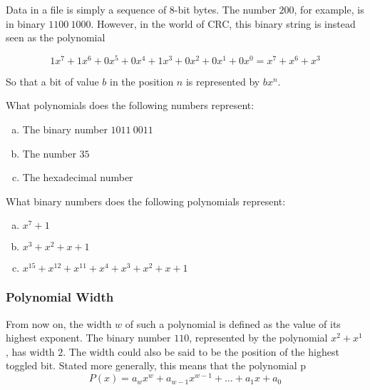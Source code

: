 Data in a file is simply a sequence of 8-bit bytes. The number $200$,
for example, is in binary $1100\ 1000$. However, in the world of CRC,
this binary string is instead seen as the polynomial

\begin{equation*}
  1x^7 + 1x^6 + 0x^5 + 0x^4 + 1x^3 + 0x^2 + 0x^1 + 0x^0 = x^7 + x^6 + x^3
\end{equation*}

So that a bit of value $b$ in the position $n$ is represented by
$bx^n$.

\begin{Exercise}[label={bin-to-poly}]

  What polynomials does the following numbers represent:

  \begin{enumerate}[(a)]
  \item The binary number $1011\ 0011$
  \item The number $35$
  \item The hexadecimal number 
  \end{enumerate}

\end{Exercise}

\begin{Exercise}[label={poly-to-bin}]

  What binary numbers does the following polynomials represent:

  \begin{enumerate}[(a)]
  \item $x^7 + 1$
  \item $x^3 + x^2 + x + 1$
  \item $x^{15} + x^{12} + x^{11} + x^4 + x^3 + x^2 + x + 1$
  \end{enumerate}

\end{Exercise}

\subsubsection{Polynomial Width}

From now on, the width $w$ of such a polynomial is defined as the
value of its highest exponent. The binary number $110$, represented by
the polynomial $x^2 + x^1$, has width $2$. The width could also be
said to be the position of the highest toggled bit. Stated more
generally, this means that the polynomial p
\begin{equation*}
  P(x) = a_wx^w + a_{w-1}x^{w-1} + \dots + a_{1}x + a_{0}
\end{equation*}


